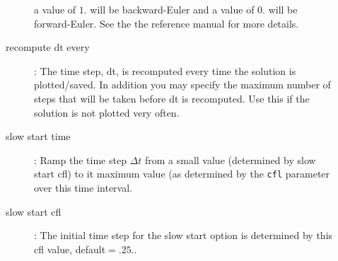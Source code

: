 \begin{description}
\begin{description}
        a value of $1.$ will be backward-Euler and a value of $0.$ will be forward-Euler. See 
        the the reference manual for more details.
      \item[recompute dt every] : The time step, dt,  is recomputed every time the solution is plotted/saved.
              In addition you may specify the maximum number of steps that will be taken
              before dt is recomputed. Use this if the solution is not plotted very often.
      \item[slow start time] : Ramp the time step $\Delta t$ from a small value (determined by slow start cfl)
         to it maximum value (as  determined by the {\tt cfl} parameter over this time interval. 
      \item[slow start cfl]: The initial time step for the slow start option is determined by this cfl value, default$=.25$..
    \end{description}
  

\end{description}
